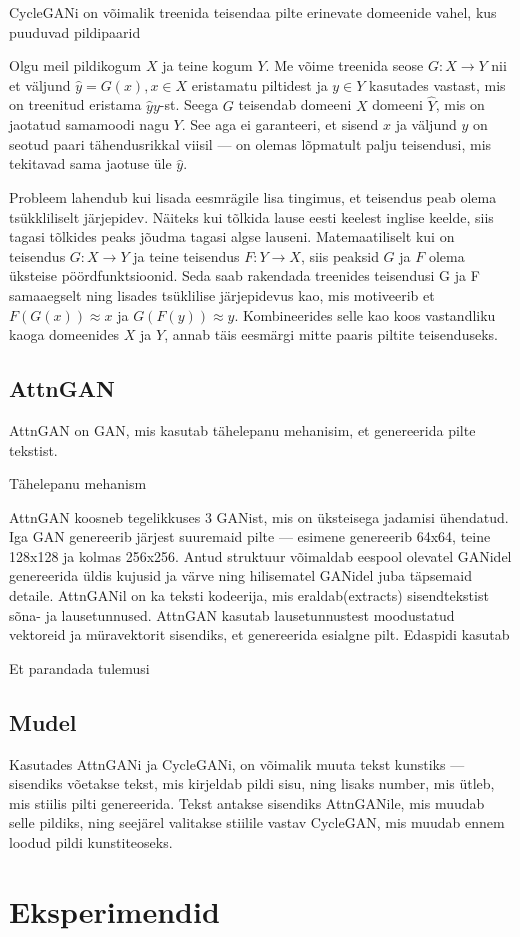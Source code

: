 \documentclass{vilgym}
\begin{document}
	
	CycleGANi on võimalik treenida teisendaa pilte erinevate domeenide vahel, kus puuduvad pildipaarid

	Olgu meil pildikogum $ X $ ja teine kogum $ Y $. Me võime treenida seose $ G: X \rightarrow Y $ nii et väljund $ \hat{y} = G(x), x \in X $ eristamatu piltidest ja $ y \in Y $ kasutades vastast, mis on treenitud eristama $ \hat{y} y $-st.
	Seega $ G $ teisendab domeeni $ X $ domeeni $ \hat{Y} $, mis on jaotatud samamoodi nagu $ Y $. See aga ei garanteeri, et sisend $ x $ ja väljund $ y $ on seotud paari tähendusrikkal viisil --- on olemas lõpmatult palju teisendusi, mis tekitavad sama jaotuse üle $ \hat{y} $.

	Probleem lahendub kui lisada eesmrägile lisa tingimus, et teisendus peab olema tsükkliliselt järjepidev. Näiteks kui tõlkida lause eesti keelest inglise keelde, siis tagasi tõlkides peaks jõudma tagasi algse lauseni. Matemaatiliselt kui on teisendus $ G: X \rightarrow Y $ ja teine teisendus $F: Y \rightarrow X $, siis peaksid $ G $ ja $ F $ olema üksteise pöördfunktsioonid.
	Seda saab rakendada treenides teisendusi G ja F samaaegselt ning lisades tsüklilise järjepidevus kao, mis motiveerib et $ F(G(x)) \approx x $ ja $ G(F(y)) \approx y $. Kombineerides selle kao koos vastandliku kaoga domeenides $ X $ ja $ Y $, annab täis eesmärgi mitte paaris piltite teisenduseks.

	\subsection{AttnGAN}
	AttnGAN on GAN, mis kasutab tähelepanu mehanisim, et genereerida pilte tekstist.
	
	Tähelepanu mehanism
	
	AttnGAN koosneb tegelikkuses 3 GANist, mis on üksteisega jadamisi ühendatud. Iga GAN genereerib järjest suuremaid pilte --- esimene genereerib 64x64, teine 128x128 ja kolmas 256x256. Antud struktuur võimaldab eespool olevatel GANidel genereerida üldis kujusid ja värve ning hilisematel GANidel juba täpsemaid detaile.
	AttnGANil on ka teksti kodeerija, mis eraldab(extracts) sisendtekstist sõna- ja lausetunnused. AttnGAN kasutab lausetunnustest moodustatud vektoreid ja müravektorit sisendiks, et genereerida esialgne pilt. Edaspidi kasutab
	
	Et parandada tulemusi

	\subsection{Mudel}
	Kasutades AttnGANi ja CycleGANi, on võimalik muuta tekst kunstiks --- sisendiks võetakse tekst, mis kirjeldab pildi sisu, ning lisaks number, mis ütleb, mis stiilis pilti genereerida. Tekst antakse sisendiks AttnGANile, mis muudab selle pildiks, ning seejärel valitakse stiilile vastav CycleGAN, mis muudab ennem loodud pildi kunstiteoseks.


	\section{Eksperimendid}


	\nocite{*} %
	\printbibliography[title={Kasutatud allikad}]
\end{document}
